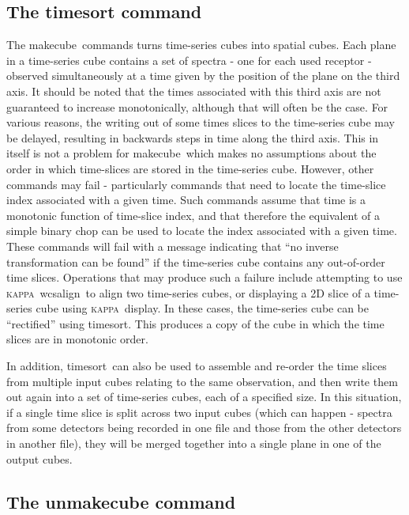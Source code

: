 \documentclass[twoside,11pt]{article}
\newcommand{\xref}[3]{#1}
\renewcommand{\_}{\texttt{\symbol{95}}}
\newcommand{\KAPPA}{\textsc{kappa}}
\newcommand{\task}[1]{\textsf{#1}}
\newcommand{\makecube}{\xref{\task{makecube}}{sun258}{MAKECUBE}}
\newcommand{\timesort}{\xref{\task{timesort}}{sun258}{TIMESORT}}
\newcommand{\wcsalign}{\xref{\task{wcsalign}}{sun95}{WCSALIGN}}
\newcommand{\display}{\xref{\task{display}}{sun95}{DISPLAY}}
\begin{document}
\subsection{The timesort command}

The \makecube\ commands turns time-series cubes into spatial cubes. Each
plane in a time-series cube contains a set of spectra - one for each
used receptor - observed simultaneously at a time given by the position
of the plane on the third axis. It should be noted that the times
associated with this third axis are not guaranteed to increase
monotonically, although that will often be the case. For various reasons,
the writing out of some times slices to the time-series cube may be delayed,
resulting in backwards steps in time along the third axis. This in itself
is not a problem for \makecube\, which makes no assumptions about the
order in which time-slices are stored in the time-series cube. However,
other commands may fail - particularly commands that need to locate the
time-slice index associated with a given time. Such commands assume that
time is a monotonic function of time-slice index, and that therefore the
equivalent of a simple binary chop can be used to locate the index
associated with a given time. These commands will fail with a message
indicating that ``no inverse transformation can be found'' if the
time-series cube contains any out-of-order time slices. Operations that
may produce such a failure include attempting to use \KAPPA\ \wcsalign\
to align two time-series cubes, or displaying a 2D slice of a time-series
cube using \KAPPA\ \display. In these cases, the time-series cube can be
``rectified'' using \timesort. This produces a copy of the cube in which
the time slices are in monotonic order.

In addition, \timesort\ can also be used to assemble and re-order the time
slices from multiple input cubes relating to the same observation, and then
write them out again into a set of time-series cubes, each of a specified
size. In this situation, if a single time slice is split across two
input cubes (which can happen - spectra from some detectors being recorded
in one file and those from the other detectors in another file), they
will be merged together into a single plane in one of the output cubes.


\subsection{The unmakecube command}
\end{document}
